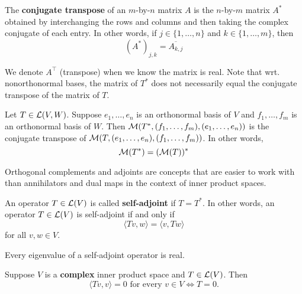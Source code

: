 \documentclass{extarticle}
\begin{document}
\begin{definition}
    The \textbf{conjugate transpose} of an \(m\)-by-\(n\) matrix \(A\) is the \(n\)-by-\(m\) matrix 
    \(A^*\) obtained by interchanging the rows and columns and then taking the complex conjugate 
    of each entry. In other words, if \(j \in \{1, \ldots, n\}\) and \(k \in \{1, \ldots, m\}\), 
    then 
    \[(A^*)_{j, k} = \overline{A_{k, j}}\]
\end{definition}

\begin{remark}
    We denote \(A^\top\) (transpose) when we know the matrix is real. Note that wrt. nonorthonormal 
    bases, the matrix of \(T^*\) does not necessarily equal the conjugate transpose of the matrix 
    of \(T\).
\end{remark}

\begin{thm}
    Let \(T \in \mathcal{L}(V, W)\). Suppose \(e_1, \ldots, e_n\) is an orthonormal basis of \(V\) and 
    \(f_1, \ldots, f_m\) is an orthonormal basis of \(W\). Then \(\mathcal{M}(T^*, (f_1, \ldots, f_m), 
    (e_1, \ldots, e_n))\) is the conjugate transpose of \(\mathcal{M}(T, (e_1, \ldots, e_n), (f_1, \ldots, f_m))\). 
    In other words, 
    \[\mathcal{M}(T^*) = (\mathcal{M}(T))^*\]
\end{thm}

\begin{remark}
    Orthogonal complements and adjoints are concepts that are easier to work with than 
    annihilators and dual maps in the context of inner product spaces.
\end{remark}

\begin{definition}
    An operator \( T \in \mathcal{L}(V)\) is called \textbf{self-adjoint} if \(T = T^*\). In other words, 
    an operator \(T \in \mathcal{L}(V)\) is self-adjoint if and only if 
    \[\langle Tv,w \rangle = \langle v,Tw \rangle\] 
    for all \(v, w \in V\).
\end{definition}

\begin{corollary}
    Every eigenvalue of a self-adjoint operator is real. 
\end{corollary}

\begin{corollary}
    Suppose \(V\) is a \textbf{complex} inner product space and \(T \in \mathcal{L}(V)\). Then 
    \[\langle Tv,v \rangle = 0 \text{ for every } v \in V \Longleftrightarrow T = 0.\]
\end{corollary}
\end{document}

